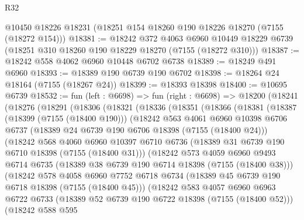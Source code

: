 \begin{lexlean}{R32}
\begin{coremodule}
    @10450
    @18226
    @18231
    (@18251 @154 @18260 @190 @18226 @18270 (@7155 (@18272 @154)))
@18381 := @18242
    @372
    @4063
    @6960
    @10449
    @18229
    @6739
    (@18251 @310 @18260 @190 @18229 @18270 (@7155 (@18272 @310)))
@18387 := @18242 @558 @4062 @6960 @10448 @6702 @6738
@18389 := @18249 @491 @6960
@18393 := @18389 @190 @6739 @190 @6702
@18398 := @18264 @24 @18164 (@7155 (@18267 @24))
@18399 := @18393 @18398
@18400 := @10695 @6739
@18532 := fun (left : @6698) =>
  fun (right : @6698) =>
  @18200
    (@18241
      (@18276
        (@18291
          (@18306
            (@18321
              (@18336
                (@18351
                  (@18366
                    (@18381
                      (@18387
                        (@18399 (@7155 (@18400 @190)))
                        (@18242
                          @563
                          @4061
                          @6960
                          @10398
                          @6706
                          @6737
                          (@18389 @24 @6739 @190 @6706 @18398 (@7155 (@18400 @24)))
                          (@18242
                            @568
                            @4060
                            @6960
                            @10397
                            @6710
                            @6736
                            (@18389 @31 @6739 @190 @6710 @18398 (@7155 (@18400 @31)))
                            (@18242
                              @573
                              @4059
                              @6960
                              @9493
                              @6714
                              @6735
                              (@18389 @38 @6739 @190 @6714 @18398 (@7155 (@18400 @38)))
                              (@18242
                                @578
                                @4058
                                @6960
                                @7752
                                @6718
                                @6734
                                (@18389 @45 @6739 @190 @6718 @18398 (@7155 (@18400 @45)))
                                (@18242
                                  @583
                                  @4057
                                  @6960
                                  @6963
                                  @6722
                                  @6733
                                  (@18389 @52 @6739 @190 @6722 @18398 (@7155 (@18400 @52)))
                                  (@18242
                                    @588
                                    @595

\end{coremodule}
\end{lexlean}
